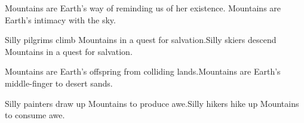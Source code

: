 \documentclass{article}
\begin{document}
Mountains are Earth's way of reminding us of her existence.\newline
Mountains are Earth's intimacy with the sky.\newline \newline

Silly pilgrims climb Mountains in a quest for salvation.\newline Silly
skiers descend Mountains in a quest for salvation.\newline\newline

Mountains are Earth's offspring from colliding lands.\newline Mountains
are Earth's middle-finger to desert sands.\newline\newline

Silly painters draw up Mountains to produce awe.\newline Silly hikers
hike up Mountains to consume awe.\newline\newline
\end{document}
